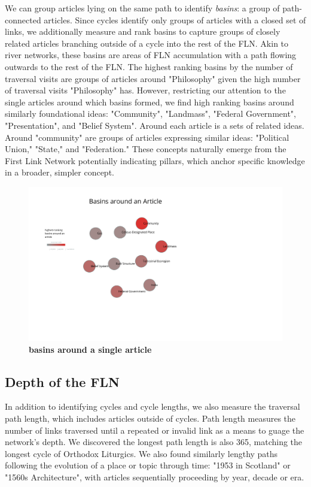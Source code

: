 \documentclass[pre,twocolumn,twoside,superscriptaddress,floatfix, aps, 10pt]{revtex4-1}
\begin{document}
We can group articles lying on the same path to identify {\it basins}: 
a group of path-connected articles.
Since cycles identify only groups of articles with a closed set of links, 
we additionally measure and rank basins to capture groups of closely related
articles branching outside of a cycle into the rest of the FLN.
Akin to river networks, these basins are areas of FLN accumulation with a path 
flowing outwards to the rest of the FLN.
The highest ranking basins by the number of traversal visits are groups of articles
around "Philosophy" given the high number of traversal visits "Philosophy" has. 
However, restricting our attention to the 
 single articles around which basins formed,
 we find high ranking basins around similarly foundational ideas:
"Community", "Landmass", "Federal Government", "Presentation", and "Belief System". 
Around each article is a sets of related ideas. Around "community" are groups of articles expressing similar ideas: "Political Union," "State," and "Federation." 
These concepts naturally emerge from the First Link Network potentially indicating pillars, which 
anchor specific knowledge in a broader, simpler concept.

\begin{figure}[tp!]
  \centering	
  \includegraphics[width=\columnwidth]{graphics/basins.pdf}
  \caption{
    \textbf{basins around a single article}
  }
  \label{fig:basins}

\end{figure}

\subsection{Depth of the FLN}

In addition to identifying cycles and cycle lengths, we also measure the traversal path length, which includes articles outside
of cycles. 
Path length measures the number of links traversed until a repeated or invalid link as a means to guage the network's depth.
We discovered the longest path length is also 365, matching the longest cycle of Orthodox Liturgics. 
We also found similarly lengthy paths following the evolution of a place or topic through time: 
"1953 in Scotland" or "1560s Architecture", with articles sequentially proceeding by year, decade or era.
\end{document}
